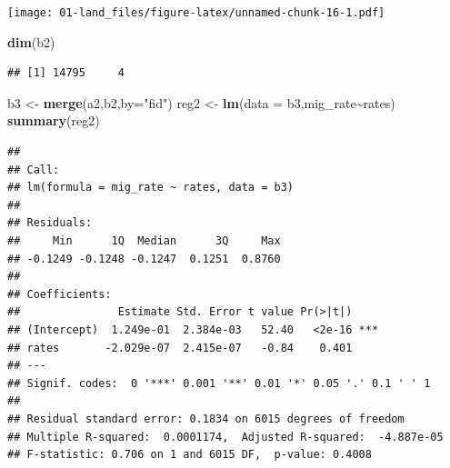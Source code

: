 \documentclass[
  oneside]{book}
\newenvironment{Shaded}{\begin{snugshade}}{\end{snugshade}}
\newcommand{\AttributeTok}[1]{\textcolor[rgb]{0.13,0.29,0.53}{#1}}
\newcommand{\CommentTok}[1]{\textcolor[rgb]{0.56,0.35,0.01}{\textit{#1}}}
\newcommand{\DecValTok}[1]{\textcolor[rgb]{0.00,0.00,0.81}{#1}}
\newcommand{\FunctionTok}[1]{\textcolor[rgb]{0.13,0.29,0.53}{\textbf{#1}}}
\newcommand{\NormalTok}[1]{#1}
\newcommand{\OtherTok}[1]{\textcolor[rgb]{0.56,0.35,0.01}{#1}}
\newcommand{\SpecialCharTok}[1]{\textcolor[rgb]{0.81,0.36,0.00}{\textbf{#1}}}
\newcommand{\StringTok}[1]{\textcolor[rgb]{0.31,0.60,0.02}{#1}}
\begin{document}
\begin{Shaded}
\end{Shaded}

\texttt{[image: 01-land\_files/figure-latex/unnamed-chunk-16-1.pdf]}

\begin{Shaded}
\begin{Highlighting}[]
\FunctionTok{dim}\NormalTok{(b2)}
\end{Highlighting}
\end{Shaded}

\begin{verbatim}
## [1] 14795     4
\end{verbatim}

\begin{Shaded}
\begin{Highlighting}[]
\NormalTok{b3 }\OtherTok{\textless{}{-}} \FunctionTok{merge}\NormalTok{(a2,b2,}\AttributeTok{by=}\StringTok{"fid"}\NormalTok{)}
\NormalTok{reg2 }\OtherTok{\textless{}{-}} \FunctionTok{lm}\NormalTok{(}\AttributeTok{data =}\NormalTok{ b3,mig\_rate}\SpecialCharTok{\textasciitilde{}}\NormalTok{rates)}
\FunctionTok{summary}\NormalTok{(reg2)}
\end{Highlighting}
\end{Shaded}

\begin{verbatim}
## 
## Call:
## lm(formula = mig_rate ~ rates, data = b3)
## 
## Residuals:
##     Min      1Q  Median      3Q     Max 
## -0.1249 -0.1248 -0.1247  0.1251  0.8760 
## 
## Coefficients:
##               Estimate Std. Error t value Pr(>|t|)    
## (Intercept)  1.249e-01  2.384e-03   52.40   <2e-16 ***
## rates       -2.029e-07  2.415e-07   -0.84    0.401    
## ---
## Signif. codes:  0 '***' 0.001 '**' 0.01 '*' 0.05 '.' 0.1 ' ' 1
## 
## Residual standard error: 0.1834 on 6015 degrees of freedom
## Multiple R-squared:  0.0001174,  Adjusted R-squared:  -4.887e-05 
## F-statistic: 0.706 on 1 and 6015 DF,  p-value: 0.4008
\end{verbatim}
\end{document}
